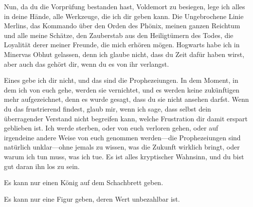 \begin{writtenNote}
Nun, da du die Vorprüfung bestanden hast, Voldemort zu besiegen, lege ich alles in deine Hände, alle Werkzeuge, die ich dir geben kann. Die Ungebrochene Linie Merlins, das Kommando über den Orden des Phönix, meinen ganzen Reichtum und alle meine Schätze, den Zauberstab aus den Heiligtümern des Todes, die Loyalität derer meiner Freunde, die mich erhören mögen.
Hogwarts habe ich in Minervas Obhut gelassen, denn ich glaube nicht, dass du Zeit dafür haben wirst, aber auch das gehört dir, wenn du es von ihr verlangst.

Eines gebe ich dir nicht, und das sind die Prophezeiungen. In dem Moment, in dem ich von euch gehe, werden sie vernichtet, und es werden keine zukünftigen mehr aufgezeichnet, denn es wurde gesagt, dass du sie nicht ansehen darfst. Wenn du das frustrierend findest, glaub mir, wenn ich sage, dass selbst dein überragender Verstand nicht begreifen kann, welche Frustration dir damit erspart geblieben ist.
Ich werde sterben, oder von euch verloren gehen, oder auf irgendeine andere Weise von euch genommen werden—die Prophezeiungen sind natürlich unklar—ohne jemals zu wissen, was die Zukunft wirklich bringt, oder warum ich tun muss, was ich tue. Es ist alles kryptischer Wahnsinn, und du bist gut daran ihn los zu sein.

Es kann nur einen König auf dem Schachbrett geben.

Es kann nur eine Figur geben, deren Wert unbezahlbar ist.


\end{writtenNote}
